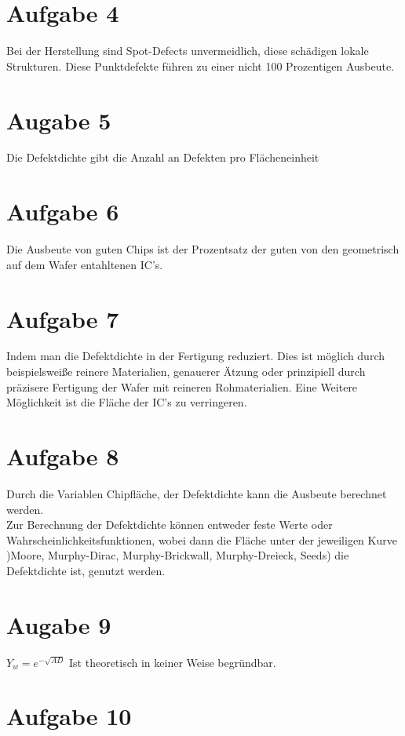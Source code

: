 \documentclass[a4paper]{scrartcl}
\begin{document}
\section*{Aufgabe 4}
Bei der Herstellung sind Spot-Defects unvermeidlich, diese schädigen lokale Strukturen. Diese Punktdefekte führen zu einer nicht 100 Prozentigen Ausbeute.


\section*{Augabe 5}
Die Defektdichte gibt die Anzahl an Defekten pro Flächeneinheit 


\section*{Aufgabe 6}
Die Ausbeute von guten Chips ist der Prozentsatz der guten von den geometrisch auf dem Wafer entahltenen IC's.


\section*{Aufgabe 7}
Indem man die Defektdichte in der Fertigung reduziert. Dies ist möglich durch beispielsweiße reinere Materialien, genauerer Ätzung oder prinzipiell durch präzisere Fertigung  der Wafer mit reineren Rohmaterialien. Eine Weitere Möglichkeit ist die Fläche der IC's zu verringeren.


\section*{Aufgabe 8}
Durch die Variablen Chipfläche, der Defektdichte kann die Ausbeute berechnet werden.\\
Zur Berechnung der Defektdichte können entweder feste Werte oder Wahrscheinlichkeitsfunktionen, wobei dann die Fläche unter der jeweiligen Kurve )Moore, Murphy-Dirac, Murphy-Brickwall, Murphy-Dreieck, Seeds) die Defektdichte ist, genutzt werden.

\section*{Augabe 9}
$Y_w = e^{-\sqrt{AD}}$
Ist theoretisch in keiner Weise begründbar.


\section*{Aufgabe 10}
\end{document}
